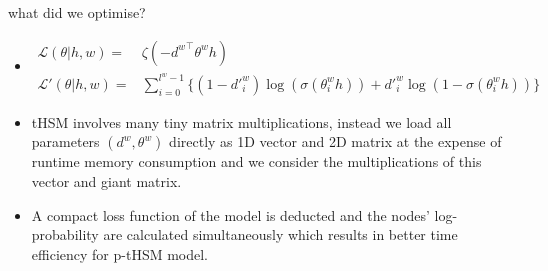 \documentclass[english]{beamer} %
\begin{document}
\begin{frame}[<+->]{what did we optimise?}


\begin{itemize}
\item \begin{equation}
\begin{split}
   \mathcal{L}(\theta|h,w) =&  \zeta(- {d^w}^\top \theta^w h ) \\
   \mathcal{L'}(\theta|h,w) =&\sum_{i=0}^{l^w-1} \{(1-d'^w_i)\log (\sigma(\theta_{i}^w h))  + {d'^w_i}\log (1-\sigma (\theta_{i}^w h))\}
\end{split}
\end{equation}
  \item tHSM involves many tiny matrix multiplications, instead  we load all parameters $(d^w, \theta^w)$ directly as 1D vector and 2D matrix at the expense of runtime memory consumption and we consider the multiplications of this vector and giant matrix.
  \item A compact loss function of the model is deducted and the nodes' log-probability are calculated simultaneously which results in better time efficiency for p-tHSM model.
\end{itemize}
\end{frame}
\end{document}
